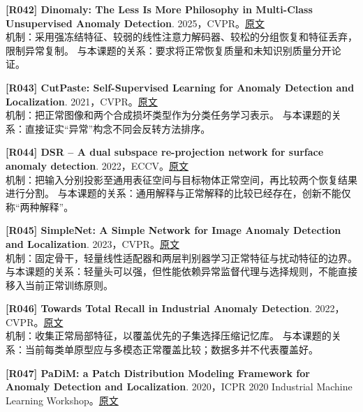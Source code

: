 \documentclass[11pt,a4paper]{article}
\begin{document}
\hypertarget{R042}{}\textbf{[R042] Dinomaly: The Less Is More Philosophy in Multi-Class Unsupervised Anomaly Detection}. 2025，CVPR。\href{https://openaccess.thecvf.com/content/CVPR2025/papers/Guo_Dinomaly_The_Less_Is_More_Philosophy_in_Multi-Class_Unsupervised_Anomaly_CVPR_2025_paper.pdf}{原文}\\
机制：采用强冻结特征、较弱的线性注意力解码器、较松的分组恢复和特征丢弃，限制异常复制。 与本课题的关系：要求将正常恢复质量和未知识别质量分开论证。\par\medskip
\hypertarget{R043}{}\textbf{[R043] CutPaste: Self-Supervised Learning for Anomaly Detection and Localization}. 2021，CVPR。\href{https://openaccess.thecvf.com/content/CVPR2021/papers/Li_CutPaste_Self-Supervised_Learning_for_Anomaly_Detection_and_Localization_CVPR_2021_paper.pdf}{原文}\\
机制：把正常图像和两个合成损坏类型作为分类任务学习表示。 与本课题的关系：直接证实“异常”构念不同会反转方法排序。\par\medskip
\hypertarget{R044}{}\textbf{[R044] DSR -- A dual subspace re-projection network for surface anomaly detection}. 2022，ECCV。\href{https://www.ecva.net/papers/eccv_2022/papers_ECCV/papers/136910526.pdf}{原文}\\
机制：把输入分别投影至通用表征空间与目标物体正常空间，再比较两个恢复结果进行分割。 与本课题的关系：通用解释与正常解释的比较已经存在，创新不能仅称“两种解释”。\par\medskip
\hypertarget{R045}{}\textbf{[R045] SimpleNet: A Simple Network for Image Anomaly Detection and Localization}. 2023，CVPR。\href{https://openaccess.thecvf.com/content/CVPR2023/papers/Liu_SimpleNet_A_Simple_Network_for_Image_Anomaly_Detection_and_Localization_CVPR_2023_paper.pdf}{原文}\\
机制：固定骨干，轻量线性适配器和两层判别器学习正常特征与扰动特征的边界。 与本课题的关系：轻量头可以强，但性能依赖异常监督代理与选择规则，不能直接移入当前正常训练原则。\par\medskip
\hypertarget{R046}{}\textbf{[R046] Towards Total Recall in Industrial Anomaly Detection}. 2022，CVPR。\href{https://openaccess.thecvf.com/content/CVPR2022/papers/Roth_Towards_Total_Recall_in_Industrial_Anomaly_Detection_CVPR_2022_paper.pdf}{原文}\\
机制：收集正常局部特征，以覆盖优先的子集选择压缩记忆库。 与本课题的关系：当前每类单原型应与多模态正常覆盖比较；数据多并不代表覆盖好。\par\medskip
\hypertarget{R047}{}\textbf{[R047] PaDiM: a Patch Distribution Modeling Framework for Anomaly Detection and Localization}. 2020，ICPR 2020 Industrial Machine Learning Workshop。\href{https://arxiv.org/pdf/2011.08785}{原文}\\
\end{document}
